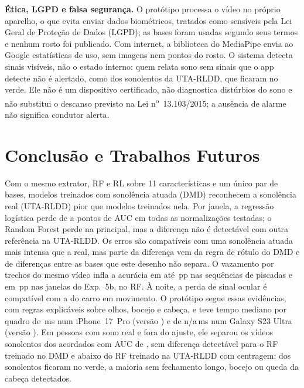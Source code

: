 \documentclass[conference]{IEEEtran}
\providecommand{\CelularSamsungTotalPcinquentaInteiro}{n/a}
\newif\ifMesmaVersaoApp
\begin{document}
\textbf{Ética, LGPD e falsa segurança.} O protótipo processa o vídeo no próprio aparelho, o que evita enviar dados biométricos, tratados como sensíveis pela Lei Geral de Proteção de Dados (LGPD); as bases foram usadas segundo seus termos e nenhum rosto foi publicado. Com internet, a biblioteca do MediaPipe envia ao Google estatísticas de uso, sem imagens nem pontos do rosto. O sistema detecta sinais visíveis, não o estado interno: quem relata sono sem sinais que o app detecte não é alertado, como \AppUTASonolentosVerdes{} dos \AppUTASujeitos{} sonolentos da UTA-RLDD, que ficaram no verde. Ele não é um dispositivo certificado, não diagnostica distúrbios do sono e não substitui o descanso previsto na Lei n\textsuperscript{o}~13.103/2015; a ausência de alarme não significa condutor alerta.

\section{Conclusão e Trabalhos Futuros}
\label{sec:conc}

Com o mesmo extrator, RF e RL sobre 11 características e um único par de bases, modelos treinados com sonolência atuada (DMD) reconhecem a sonolência real (UTA-RLDD) pior que modelos treinados nela. Por janela, a regressão logística perde de \ExpCincoBLRQuedaNormMin{} a \ExpCincoBLRQuedaNormMax{} pontos de AUC em todas as normalizações testadas; o Random Forest perde \ExpCincoBQuedaAUCJanela{} na principal, mas a diferença não é detectável com outra referência na UTA-RLDD. Os erros são compatíveis com uma sonolência atuada mais intensa que a real, mas parte da diferença vem da regra de rótulo do DMD e de diferenças entre as bases que este desenho não separa. O vazamento por trechos do mesmo vídeo infla a acurácia em até \ExpDoisRFInflacaoJanelaBSA\,pp nas sequências de piscadas e em \ExpCincoBVazamentoAcBal\,pp nas janelas do Exp.~5b, no RF. À noite, a perda de sinal ocular é compatível com a do carro em movimento. O protótipo segue essas evidências, com regras explicáveis sobre olhos, bocejo e cabeça, e \ifMesmaVersaoApp a versão \CelularIPhoneVersaoApp{} teve tempo mediano por quadro de \CelularIPhoneTotalPcinquentaInteiro\,ms num iPhone~17~Pro\ifSamsungMedido{} e de \CelularSamsungTotalPcinquentaInteiro\,ms num Galaxy S23 Ultra\fi\else teve tempo mediano por quadro de \CelularIPhoneTotalPcinquentaInteiro\,ms num iPhone~17~Pro (versão \CelularIPhoneVersaoApp) e de \CelularSamsungTotalPcinquentaInteiro\,ms num Galaxy S23 Ultra (versão \CelularSamsungVersaoApp)\fi. Em \AppUTASujeitos{} pessoas com sono real e fora do ajuste, ele separou os vídeos sonolentos dos acordados com AUC de \AppUTAAUCForaVerde, sem diferença detectável para o RF treinado no DMD e abaixo do RF treinado na UTA-RLDD com centragem; \AppUTASonolentosVerdes{} dos \AppUTASujeitos{} sonolentos ficaram no verde, a maioria sem fechamento longo, bocejo ou queda da cabeça detectados.
\end{document}
